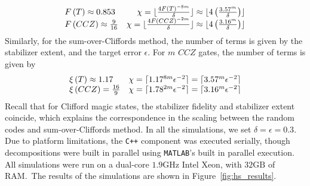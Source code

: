 \begin{equation}
\begin{array}{l r}
F\left(T\right)\approx 0.853 & \chi = \lfloor\frac{4 F\left(T\right)^{-8m}}{\delta}\rfloor \approx \lfloor 4\left(\frac{3.57^{m}}{\delta}\right)\rfloor\\ 
F\left(CCZ\right)\approx \frac{9}{16} & \chi = \lfloor\frac{4 F\left(CCZ\right)^{-2m}}{\delta}\rfloor \approx \lfloor 4\left(\frac{3.16^{m}}{\delta}\right)\rfloor\\ 
\end{array}
\end{equation}
Similarly, for the sum-over-Cliffords method, the number of terms is given by the stabilizer extent, and the target error $\epsilon$. For $m$ $CCZ$ gates, the number of terms is given by
\begin{equation}
\begin{array}{l r}
\xi\left(T\right) \approx 1.17 & \chi = \lceil 1.17^{8m} \epsilon^{-2}\rceil = \lceil 3.57^{m}\epsilon^{-2}\rceil \\
\xi\left(CCZ\right) = \frac{16}{9} & \chi = \lceil 1.78^{2m}\epsilon^{-2}\rceil = \lceil 3.16^{m}\epsilon^{-2}\rceil
\end{array}
\end{equation}
Recall that for Clifford magic states, the stabilizer fidelity and stabilizer extent coincide, which explains the correspondence in the scaling between the random codes and sum-over-Cliffords method. In all the simulations, we set $\delta=\epsilon=0.3$. Due to platform limitations, the \texttt{C++} component was executed serially, though decompositions were built in parallel using \texttt{MATLAB}'s built in parallel execution. All simulations were run on a dual-core $1.9\mathrm{GHz}$ Intel Xeon, with $32\mathrm{GB}$ of RAM.\ The results of the simulations are shown in Figure~\ref{fig:hs_results}.
